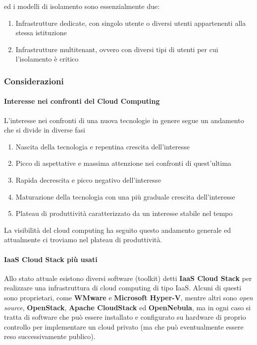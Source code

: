 \documentclass[italian,]{article}
\providecommand{\tightlist}{%
  \setlength{\itemsep}{0pt}\setlength{\parskip}{0pt}}
\let\oldparagraph\paragraph
\renewcommand{\paragraph}[1]{\oldparagraph{#1}\mbox{}}
\begin{document}
ed i modelli di isolamento sono essenzialmente due:

\begin{enumerate}
\def\labelenumi{\arabic{enumi}.}
\tightlist
\item
  Infrastrutture dedicate, con singolo utente o diversi utenti
  appartenenti alla stessa istituzione
\item
  Infrastrutture multitenant, ovvero con diversi tipi di utenti per cui
  l'isolamento è critico
\end{enumerate}

\subsubsection{Considerazioni}\label{considerazioni}

\paragraph{Interesse nei confronti del Cloud
Computing}\label{interesse-nei-confronti-del-cloud-computing}

L'interesse nei confronti di una nuova tecnologie in genere segue un
andamento che si divide in diverse fasi

\begin{enumerate}
\def\labelenumi{\arabic{enumi}.}
\tightlist
\item
  Nascita della tecnologia e repentina crescita dell'interesse
\item
  Picco di aspettative e massima attenzione nei confronti di
  quest'ultima
\item
  Rapida decrescita e picco negativo dell'interesse
\item
  Maturazione della tecnologia con una più graduale crescita
  dell'interesse
\item
  Plateau di produttività caratterizzato da un interesse stabile nel
  tempo
\end{enumerate}

La visibilità del cloud computing ha seguito questo andamento generale
ed attualmente ci troviamo nel plateau di produttività.

\paragraph{IaaS Cloud Stack più
usati}\label{iaas-cloud-stack-piuxf9-usati}

Allo stato attuale esistono diversi software (toolkit) detti
\textbf{IaaS Cloud Stack} per realizzare una infrastruttura di cloud
computing di tipo IaaS. Alcuni di questi sono proprietari, come
\textbf{WMware} e \textbf{Microsoft Hyper-V}, mentre altri sono
\emph{open source}, \textbf{OpenStack}, \textbf{Apache CloudStack} ed
\textbf{OpenNebula}, ma in ogni caso si tratta di software che può
essere installato e configurato su hardware di proprio controllo per
implementare un cloud privato (ma che può eventualmente essere reso
successivamente publico).
\end{document}

